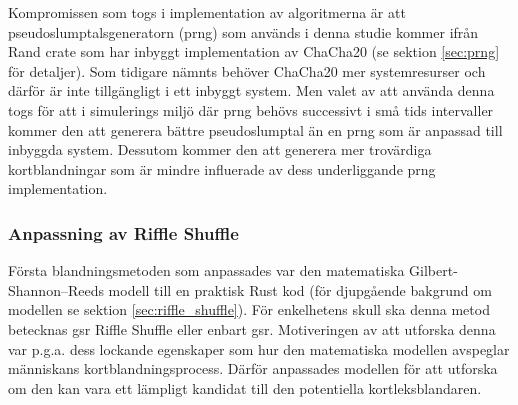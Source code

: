 \documentclass[swedish,a4paper]{article}
\begin{document}
Kompromissen som togs i implementation av algoritmerna är att
pseudoslumptalsgeneratorn (\gls{prng}) som används i denna studie kommer ifrån
Rand \gls{crate} som har inbyggt implementation av ChaCha20 (se sektion
\ref{sec:prng} för detaljer). Som tidigare nämnts behöver ChaCha20 mer
systemresurser och därför är inte tillgängligt i ett inbyggt system. Men
valet av att använda denna togs för att i simulerings miljö där \gls{prng} behövs
successivt i små tids intervaller kommer den att generera bättre pseudoslumptal
än en \gls{prng} som är anpassad till inbyggda system. Dessutom kommer den att
generera mer trovärdiga kortblandningar som är mindre influerade av dess
underliggande \gls{prng} implementation. 

\subsubsection{Anpassning av Riffle Shuffle}

 

Första blandningsmetoden som anpassades var den matematiska
Gilbert-Shannon–Reeds modell till en praktisk Rust kod (för djupgående bakgrund
om modellen se sektion \ref{sec:riffle_shuffle}). För enkelhetens skull ska denna metod
betecknas \gls{gsr} Riffle Shuffle eller enbart \gls{gsr}. Motiveringen av att
utforska denna var p.g.a. dess lockande egenskaper som hur den matematiska
modellen avspeglar människans kortblandningsprocess. Därför anpassades modellen för att
utforska om den kan vara ett lämpligt kandidat till den potentiella
kortleksblandaren.
\end{document}
